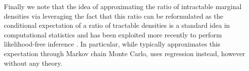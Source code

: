 Finally we note that the idea of approximating the ratio of intractable marginal densities via leveraging the fact that this ratio can be reformulated as the conditional expectation of a ratio of tractable densities is a standard idea in computational statistics \cite{meng1996simulating} and has been exploited more recently to perform likelihood-free inference \cite{brehmer2020mining}. In particular, while  \cite{meng1996simulating} typically approximates this expectation through Markov chain Monte Carlo, \cite{brehmer2020mining} uses regression instead, however without any theory.



